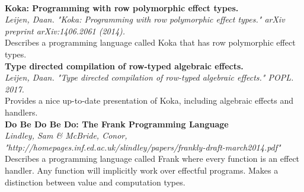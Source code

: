 \documentclass[12pt]{article}
\begin{document}
\\
\textbf{Koka: Programming with row polymorphic effect types.} \\
\textit{Leijen, Daan. "Koka: Programming with row polymorphic effect types." arXiv preprint arXiv:1406.2061 (2014).} \\
Describes a programming language called Koka that has row polymorphic effect types.
\\
\textbf{Type directed compilation of row-typed algebraic effects.} \\
\textit{Leijen, Daan. "Type directed compilation of row-typed algebraic effects." POPL. 2017.} \\
Provides a nice up-to-date presentation of Koka, including algebraic effects and handlers.
\\
\textbf{Do Be Do Be Do: The Frank Programming Language} \\
\textit{Lindley, Sam \& McBride, Conor, "http://homepages.inf.ed.ac.uk/slindley/papers/frankly-draft-march2014.pdf"} \\
Describes a programming language called Frank where every function is an effect handler. Any function will implicitly work over effectful programs.
Makes a distinction between value and computation types.
\end{document}
